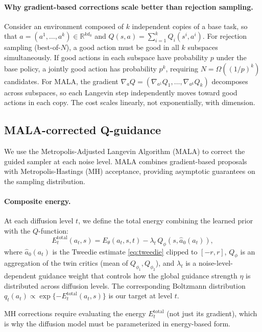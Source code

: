\documentclass{article}
\theoremstyle{plain}
\theoremstyle{definition}
\theoremstyle{remark}
\begin{document}
\paragraph{Why gradient-based corrections scale better than rejection sampling.}
Consider an environment composed of $k$ independent copies of a base task, so that $a = (a^1, \ldots, a^k) \in \mathbb{R}^{k d_0}$ and $Q(s,a) = \sum_{i=1}^k Q_i(s^i, a^i)$.
For rejection sampling (best-of-$N$), a good action must be good in all $k$ subspaces simultaneously.
If good actions in each subspace have probability $p$ under the base policy, a jointly good action has probability $p^k$, requiring $N = \Omega((1/p)^k)$ candidates.
For MALA, the gradient $\nabla_a Q = (\nabla_{a^1} Q_1, \ldots, \nabla_{a^k} Q_k)$ decomposes across subspaces, so each Langevin step independently moves toward good actions in each copy.
The cost scales linearly, not exponentially, with dimension.

\subsection{MALA-corrected Q-guidance}
\label{sec:mala}

We use the Metropolis-Adjusted Langevin Algorithm (MALA) to correct the guided sampler at each noise level.
MALA combines gradient-based proposals with Metropolis-Hastings (MH) acceptance, providing asymptotic guarantees on the sampling distribution.

\paragraph{Composite energy.}
At each diffusion level $t$, we define the total energy combining the learned prior with the $Q$-function:
\begin{equation}
  E_t^{\text{total}}(a_t, s) = E_\theta(a_t, s, t) - \lambda_t \, Q_\phi(s, \hat{a}_0(a_t)),
  \label{eq:total-energy}
\end{equation}
where $\hat{a}_0(a_t)$ is the Tweedie estimate \cref{eq:tweedie} clipped to $[-r, r]$, $Q_\phi$ is an aggregation of the twin critics (mean of $Q_{\phi_1}, Q_{\phi_2}$), and $\lambda_t$ is a noise-level-dependent guidance weight that controls how the global guidance strength $\eta$ is distributed across diffusion levels.
The corresponding Boltzmann distribution $q_t(a_t) \propto \exp\{-E_t^{\text{total}}(a_t, s)\}$ is our target at level $t$.

MH corrections require evaluating the energy $E_t^{\text{total}}$ (not just its gradient), which is why the diffusion model must be parameterized in energy-based form.
\end{document}

